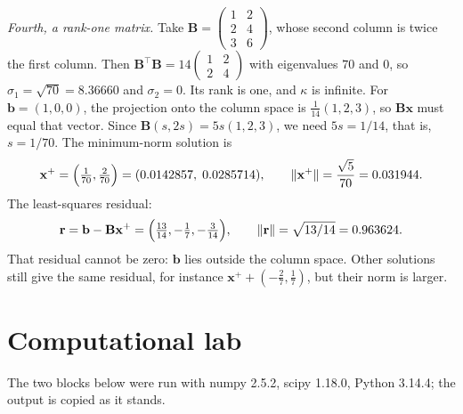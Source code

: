 \emph{Fourth, a rank-one matrix.} Take
$\mathbf{B}=\begin{pmatrix}1&2\\ 2&4\\ 3&6\end{pmatrix}$, whose second column is twice
the first column. Then $\mathbf{B}^{\top}\mathbf{B}=14\begin{pmatrix}1&2\\ 2&4\end{pmatrix}$
with eigenvalues $70$ and $0$, so $\sigma_{1}=\sqrt{70}=8.36660$ and
$\sigma_{2}=0$. Its rank is one, and $\kappa$ is infinite. For $\mathbf{b}=(1,0,0)$,
the projection onto the column space is $\frac{1}{14}(1,2,3)$, so $\mathbf{B}\mathbf{x}$
must equal that vector. Since $\mathbf{B}(s,2s)=5s(1,2,3)$, we need
$5s=1/14$, that is, $s=1/70$. The minimum-norm solution is
\[
  \mathbf{x}^{+}=\Bigl(\tfrac{1}{70},\tfrac{2}{70}\Bigr)=(0.0142857,\;0.0285714),
  \qquad
  \|\mathbf{x}^{+}\|=\frac{\sqrt{5}}{70}=0.031944 .
\]
The least-squares residual:
\[
  \mathbf{r}=\mathbf{b}-\mathbf{B}\mathbf{x}^{+}
  =\Bigl(\tfrac{13}{14},-\tfrac17,-\tfrac{3}{14}\Bigr),
  \qquad
  \|\mathbf{r}\|=\sqrt{13/14}=0.963624 .
\]
That residual cannot be zero: $\mathbf{b}$ lies outside the column space. Other solutions still give the
same residual, for instance $\mathbf{x}^{+}+(-\tfrac27,\tfrac17)$, but their norm is
larger.


\section{Computational lab}

The two blocks below were run with numpy 2.5.2, scipy 1.18.0, Python 3.14.4; the output is
copied as it stands.

